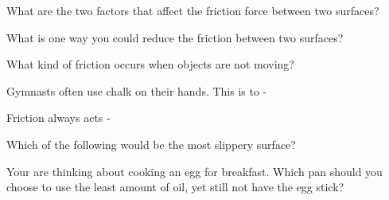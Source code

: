 \documentclass[10pt]{examdesign}
\begin{document}
\begin{multiplechoice} [title={Multiple Choice},
	rearrange=no]


	
	\begin{question}
What are the two factors that affect the friction force between two surfaces?
	\end{question}



\begin{question}
What is one way you could reduce the friction between two surfaces?
\end{question}

\begin{question}
What kind of friction occurs when objects are not moving?
\end{question}

\begin{question}
Gymnasts often use chalk on their hands.  This is to - 
\end{question}

\begin{question}
	Friction always acts - 
\end{question}


\begin{question}
Which of the following would be the most slippery surface?
	\end{question}



\begin{question}
Your are thinking about cooking an egg for breakfast.  Which pan should you choose to use the least amount of oil, yet still not have the egg stick?

	\end{question}

\end{multiplechoice} 
\end{document}
